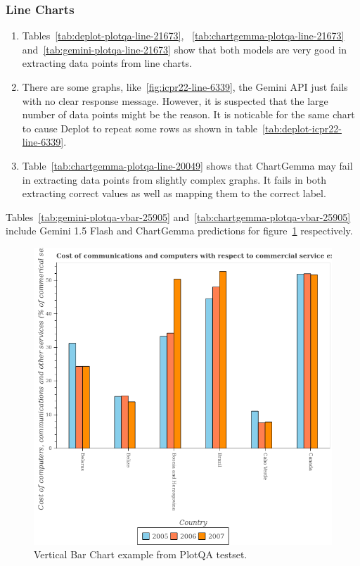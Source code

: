 \documentclass[
	letterpaper, %
]{jdf}
\begin{document}
       \subsubsection{Line Charts}\label{sssect:line-errors}
       \begin{enumerate}
  \item Tables~\ref{tab:deplot-plotqa-line-21673}, ~\ref{tab:chartgemma-plotqa-line-21673} and~\ref{tab:gemini-plotqa-line-21673} show that both models are very good in extracting data points from line charts.
     \item There are some graphs, like~\ref{fig:icpr22-line-6339}, the Gemini API just fails with no clear response message.
       However, it is suspected that the large number of data points might be the reason.
               It is noticable for the same chart to cause Deplot to repeat some rows as shown in table~\ref{tab:deplot-icpr22-line-6339}.
     \item Table~\ref{tab:chartgemma-plotqa-line-20049} shows that ChartGemma may fail in extracting data points from slightly complex graphs.
       It fails in both extracting correct values as well as mapping them to the correct label.
              \end{enumerate}
       Tables~\ref{tab:gemini-plotqa-vbar-25905} and~\ref{tab:chartgemma-plotqa-vbar-25905} include Gemini 1.5 Flash and ChartGemma predictions for figure~\ref{fig:plotqa-vbar-25905} respectively.
\begin{figure}
   \includegraphics{test-sample/plotqa/images/vertical-bar/25905.png}
   \caption{Vertical Bar Chart example from PlotQA testset.}\label{fig:plotqa-vbar-25905}
   \end{figure}



\end{document}
